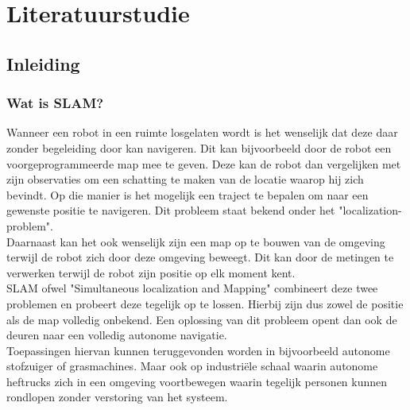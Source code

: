 \chapter{Literatuurstudie}
\label{hoofdstuk:1}
\section{Inleiding}
\subsection{Wat is SLAM?}
Wanneer een robot in een ruimte losgelaten wordt is het wenselijk dat deze daar zonder begeleiding door kan navigeren. Dit kan bijvoorbeeld door de robot een voorgeprogrammeerde map mee te geven. Deze kan de robot dan vergelijken met zijn observaties om een schatting te maken van de locatie waarop hij zich bevindt. Op die manier is het mogelijk een traject te bepalen om naar een gewenste positie te navigeren.  Dit probleem staat bekend onder het "localization-problem". \\
Daarnaast kan het ook wenselijk zijn een map op te bouwen van de omgeving terwijl de robot zich door deze omgeving beweegt. Dit kan door de metingen te verwerken terwijl de robot zijn positie op elk moment kent. \\
SLAM ofwel "Simultaneous localization and Mapping" combineert deze twee problemen en probeert deze tegelijk op te lossen. Hierbij zijn dus zowel de positie als de map volledig onbekend. Een oplossing van dit probleem opent dan ook de deuren naar een volledig autonome navigatie. \\
Toepassingen hiervan kunnen teruggevonden worden in bijvoorbeeld autonome stofzuiger of grasmachines. Maar ook op industriële schaal waarin autonome heftrucks zich in een omgeving voortbewegen waarin tegelijk personen kunnen rondlopen zonder verstoring van het systeem.\cite{Course}\\

